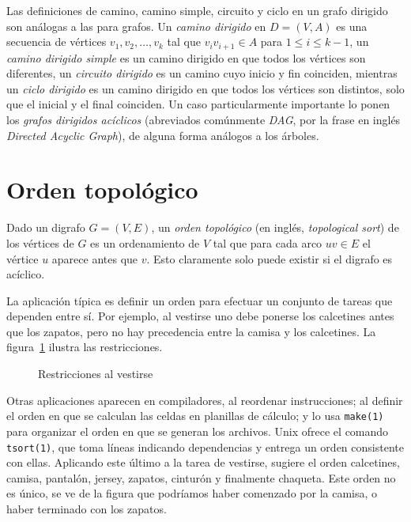   Las definiciones de camino,
  camino simple,
  circuito y ciclo en un grafo dirigido
  son análogas a las para grafos.
  Un \emph{camino dirigido} en \(D = (V, A)\)%
  es una secuencia de vértices \(v_1, v_2, \dotsc, v_k\)
  tal que \(v_i v_{i + 1} \in A\) para \(1 \le i \le k - 1\),
  un \emph{camino dirigido simple} es un camino dirigido
  en que todos los vértices son diferentes,
  un \emph{circuito dirigido}%
  es un camino cuyo inicio y fin coinciden,
  mientras un \emph{ciclo dirigido}%
  es un camino dirigido
  en que todos los vértices son distintos,
  solo que el inicial y el final coinciden.
  Un caso particularmente importante
  lo ponen los \emph{grafos dirigidos acíclicos}%
  (abreviados comúnmente \emph{DAG},%
   por la frase en inglés
   \emph{\foreignlanguage{english}{Directed Acyclic Graph}}),
  de alguna forma análogos a los árboles.

\section{Orden topológico}
\label{sec:topological-sort}

  Dado un digrafo \(G = (V, E)\),
  un \emph{orden topológico}
  (en inglés,
   \emph{\foreignlanguage{english}{topological sort}})
  de los vértices de \(G\)
  es un ordenamiento de \(V\) tal que para cada arco \(u v \in E\)
  el vértice \(u\) aparece antes que \(v\).
  Esto claramente solo puede existir si el digrafo es acíclico.

  La aplicación típica es definir un orden
  para efectuar un conjunto de tareas
  que dependen entre sí.
  Por ejemplo,
  al vestirse uno debe ponerse los calcetines
  antes que los zapatos,
  pero no hay precedencia entre la camisa y los calcetines.
  La figura~\ref{fig:dressing} ilustra las restricciones.
  \begin{figure}[ht]
    \centering
    \caption{Restricciones al vestirse}
    \label{fig:dressing}
  \end{figure}
  Otras aplicaciones aparecen en compiladores,
  al reordenar instrucciones;%
  al definir el orden
  en que se calculan las celdas en planillas de cálculo;
  y lo usa \texttt{make(1)}%
  para organizar el orden en que se generan los archivos.
  Unix%
  ofrece el comando \texttt{tsort(1)},%
  que toma líneas indicando dependencias
  y entrega un orden consistente con ellas.
  Aplicando este último a la tarea de vestirse,
  sugiere el orden
  calcetines,
  camisa,
  pantalón,
  jersey,
  zapatos,
  cinturón
  y finalmente chaqueta.
  Este orden no es único,
  se ve de la figura que podríamos haber comenzado por la camisa,
  o haber terminado con los zapatos.


